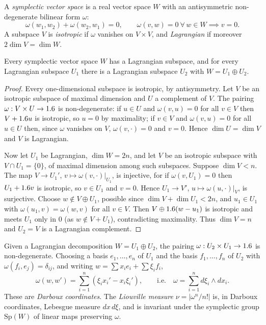 A \emph{symplectic vector space} is a real vector space $W$ with an
antisymmetric non-degenerate bilinear form $\omega$:
\begin{equation*}
  \omega(w_1,w_2)+\omega(w_2,w_1)=0,\qquad\omega(v,w)=0\ \forall\,w\in W\implies v=0 .
\end{equation*}
A subspace $V$ is \emph{isotropic} if $\omega$ vanishes on $V\times V$, and
\emph{Lagrangian} if moreover $2\dim V=\dim W$.

\begin{lemma}\label{isotropic:lem:lagrangian}
Every symplectic vector space $W$ has a Lagrangian subspace, and for every
Lagrangian subspace $U_1$ there is a Lagrangian subspace $U_2$ with
$W=U_1\oplus U_2$.
\end{lemma}
\begin{proof}
Every one-dimensional subspace is isotropic, by antisymmetry. Let $V$ be an
isotropic subspace of maximal dimension and $U$ a complement of $V$. The
pairing $\omega:V\times U\to1.6$ is non-degenerate: if $u\in U$ and
$\omega(v,u)=0$ for all $v\in V$ then $V+1.6 u$ is isotropic, so $u=0$ by
maximality; if $v\in V$ and $\omega(v,u)=0$ for all $u\in U$ then, since $\omega$
vanishes on $V$, $\omega(v,\cdot)=0$ and $v=0$. Hence $\dim U=\dim V$ and $V$ is
Lagrangian.

Now let $U_1$ be Lagrangian, $\dim W=2n$, and let $V$ be an isotropic subspace
with $V\cap U_1=\{0\}$, of maximal dimension among such subspaces. Suppose
$\dim V<n$. The map $V\to U_1'$, $v\mapsto\omega(v,\cdot)|_{U_1}$, is injective,
for if $\omega(v,U_1)=0$ then $U_1+1.6 v$ is isotropic, so $v\in U_1$ and $v=0$.
Hence $U_1\to V'$, $u\mapsto\omega(u,\cdot)|_V$, is surjective. Choose
$w\notin V\oplus U_1$, possible since $\dim V+\dim U_1<2n$, and $u_1\in U_1$
with $\omega(u_1,v)=\omega(w,v)$ for all $v\in V$. Then $V\oplus1.6(w-u_1)$ is
isotropic and meets $U_1$ only in $0$ (as $w\notin V+U_1$), contradicting
maximality. Thus $\dim V=n$ and $U_2=V$ is a Lagrangian complement.
\end{proof}

Given a Lagrangian decomposition $W=U_1\oplus U_2$, the pairing
$\omega:U_2\times U_1\to1.6$ is non-degenerate. Choosing a basis $e_1,\dots,e_n$ of
$U_1$ and the basis $f_1,\dots,f_n$ of $U_2$ with $\omega(f_i,e_j)=\delta_{ij}$,
and writing $w=\sum x_ie_i+\sum\xi_if_i$,
\begin{equation}\label{isotropic:eq:darboux}
  \omega(w,w')=\sum_{i=1}^n(\xi_ix_i'-x_i\xi_i'),\qquad\text{i.e.}\quad\omega=\sum_{i=1}^nd\xi_i\wedge dx_i .
\end{equation}
These are \emph{Darboux coordinates}. The \emph{Liouville measure}
$\nu=|\omega^n/n!|$ is, in Darboux coordinates, Lebesgue measure $dx\,d\xi$,
and is invariant under the symplectic group $\mathrm{Sp}(W)$ of linear maps
preserving $\omega$.

